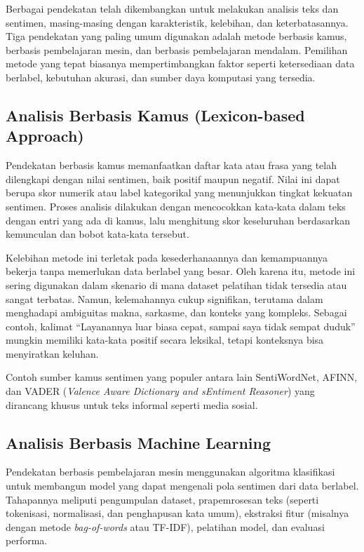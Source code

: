Berbagai pendekatan telah dikembangkan untuk melakukan analisis teks dan sentimen, masing-masing dengan karakteristik, kelebihan, dan keterbatasannya. Tiga pendekatan yang paling umum digunakan adalah metode berbasis kamus, berbasis pembelajaran mesin, dan berbasis pembelajaran mendalam. Pemilihan metode yang tepat biasanya mempertimbangkan faktor seperti ketersediaan data berlabel, kebutuhan akurasi, dan sumber daya komputasi yang tersedia.

\subsection{Analisis Berbasis Kamus (Lexicon-based Approach)}

Pendekatan berbasis kamus memanfaatkan daftar kata atau frasa yang telah dilengkapi dengan nilai sentimen, baik positif maupun negatif. Nilai ini dapat berupa skor numerik atau label kategorikal yang menunjukkan tingkat kekuatan sentimen. Proses analisis dilakukan dengan mencocokkan kata-kata dalam teks dengan entri yang ada di kamus, lalu menghitung skor keseluruhan berdasarkan kemunculan dan bobot kata-kata tersebut.

Kelebihan metode ini terletak pada kesederhanaannya dan kemampuannya bekerja tanpa memerlukan data berlabel yang besar. Oleh karena itu, metode ini sering digunakan dalam skenario di mana dataset pelatihan tidak tersedia atau sangat terbatas. Namun, kelemahannya cukup signifikan, terutama dalam menghadapi ambiguitas makna, sarkasme, dan konteks yang kompleks. Sebagai contoh, kalimat “Layanannya luar biasa cepat, sampai saya tidak sempat duduk” mungkin memiliki kata-kata positif secara leksikal, tetapi konteksnya bisa menyiratkan keluhan.

Contoh sumber kamus sentimen yang populer antara lain SentiWordNet, AFINN, dan VADER (\textit{Valence Aware Dictionary and sEntiment Reasoner}) yang dirancang khusus untuk teks informal seperti media sosial.

\subsection{Analisis Berbasis Machine Learning}

Pendekatan berbasis pembelajaran mesin menggunakan algoritma klasifikasi untuk membangun model yang dapat mengenali pola sentimen dari data berlabel. Tahapannya meliputi pengumpulan dataset, prapemrosesan teks (seperti tokenisasi, normalisasi, dan penghapusan kata umum), ekstraksi fitur (misalnya dengan metode \textit{bag-of-words} atau TF-IDF), pelatihan model, dan evaluasi performa.

